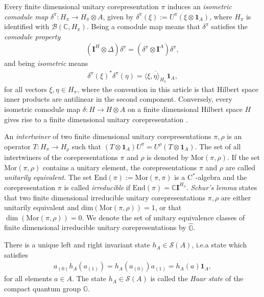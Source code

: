 \documentclass{amsart}
\theoremstyle{plain}
\theoremstyle{definition}
\theoremstyle{remark}
\begin{document}
	Every finite dimensional unitary corepresentation $\pi$ induces an \emph{isometric comodule map} $\delta^\pi : H_\pi \rightarrow H_\pi \otimes A$, given by $\delta^\pi(\xi) := U^\pi(\xi \otimes \mathbf{1}_A)$,
	where $H_\pi$ is identified with $\mathcal{B}(\mathbb{C},H_\pi)$.
	Being a comodule map means that $\delta^\pi$ satisfies the \emph{comodule property}
	\begin{align}\label{eqn:Comodule-property}
		(\mathbf{I}^H \otimes \Delta) \delta^\pi = (\delta^\pi \otimes \mathbf{I}^A) \delta^\pi,
	\end{align}
	and being \emph{isometric} means
	\begin{align}
		\delta^\pi(\xi)^*\delta^\pi(\eta) = \overline{\langle \xi, \eta \rangle_{H_\pi}} \mathbf{1}_A,
	\end{align}
	for all vectors $\xi, \eta \in H_\pi$, where the convention in this article is that Hilbert space inner products are antilinear in the second component.
	Conversely, every isometric comodule map $\delta : H \rightarrow H \otimes A$ on a finite dimensional Hilbert space $H$ gives rise to a finite dimensional unitary corepresentation \cite[Lemma 1.7]{DC16}.
	
	An \emph{intertwiner} of two finite dimensional unitary corepresentations $\pi, \rho$ is an operator $T : H_\pi \rightarrow H_\rho$ such that $(T \otimes \mathbf{1}_A) U^\pi = U^\rho (T \otimes \mathbf{1}_A)$.
	The set of all intertwiners of the corepresentations $\pi$ and $\rho$ is denoted by $\mathrm{Mor}(\pi,\rho)$.
	If the set $\mathrm{Mor}(\pi,\rho)$ contains a unitary element, the corepresentations $\pi$ and $\rho$ are called \emph{unitarily equivalent}.
	The set $\mathrm{End}(\pi) := \mathrm{Mor}(\pi,\pi)$ is a $\mathrm{C}^*$-algebra and the co\-re\-pre\-sen\-tation $\pi$ is called \emph{irreducible} if $\mathrm{End}(\pi) = \mathbb{C} \mathbf{I}^{H_\pi}$.
	\emph{Schur's lemma} states that two finite dimensional irreducible unitary corepresentations $\pi,\rho$ are either unitarily equivalent and $\mathrm{dim}(\mathrm{Mor}(\pi,\rho)) = 1$, or that $\dim(\mathrm{Mor}(\pi,\rho)) = 0$. 
	We denote the set of unitary equivalence classes of finite dimensional irreducible unitary corepresentations by $\widehat{\mathbb{G}}$.
	
	There is a unique left and right invariant state $h_A \in \mathcal{S}(A)$, i.e.\@ a state which satisfies
	\begin{align}
		a_{(0)}h_A(a_{(1)}) = h_A(a_{(0)})a_{(1)} = h_A(a) \mathbf{1}_A,
	\end{align}
	for all elements $a \in A$.
	The state $h_A \in \mathcal{S}(A)$ is called the \emph{Haar state} of the compact quantum group $\mathbb{G}$.
	
\end{document}
